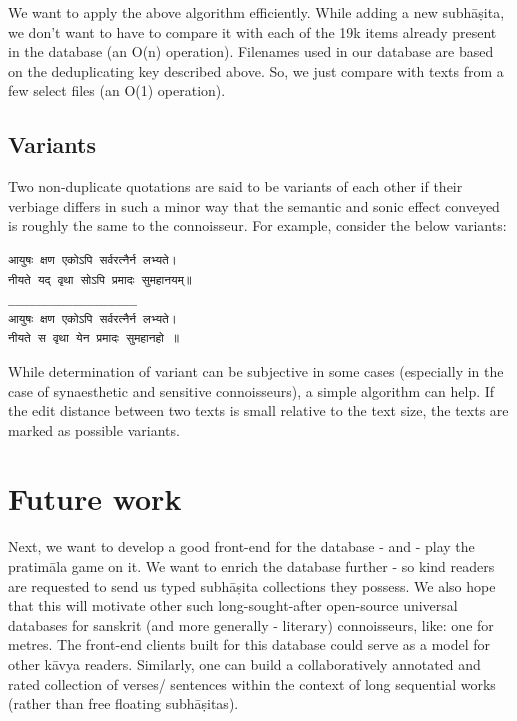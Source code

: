 \documentclass[11pt]{article}
\begin{document}
We want to apply the above algorithm efficiently. While adding a new subhāṣita, we don't want to have to compare it with each of the 19k items already present in the database (an O(n) operation). Filenames used in our database are based on the deduplicating key described above. So, we just compare with texts from a few select files (an O(1) operation).

\subsection{Variants}
Two non-duplicate quotations are said to be variants of each other if their verbiage differs in such a minor way that the semantic and sonic effect conveyed is roughly the same to the connoisseur. For example, consider the below variants:

\begin{verbatim}
आयुषः क्षण एकोऽपि सर्वरत्नैर्न लभ्यते।  
नीयते यद् वृथा सोऽपि प्रमादः सुमहानयम्॥
__________________
आयुषः क्षण एकोऽपि सर्वरत्नैर्न लभ्यते।  
नीयते स वृथा येन प्रमादः सुमहानहो ॥
\end{verbatim}

While determination of variant can be subjective in some cases (especially in the case of synaesthetic and sensitive connoisseurs), a simple algorithm can help. If the edit distance between two texts is small relative to the text size, the texts are marked as possible variants.

\section{Future work}
Next, we want to develop a good front-end for the database - and - play the pratimāla game on it. We want to enrich the database further - so kind readers are requested to send us typed subhāṣita collections they possess. We also hope that this will motivate other such long-sought-after open-source universal databases for sanskrit (and more generally - literary) connoisseurs, like: one for metres. The front-end clients built for this database could serve as a model for other kāvya readers. Similarly, one can build a collaboratively annotated and rated collection of verses/ sentences within the context of long sequential works (rather than free floating subhāṣitas).



\end{document}
